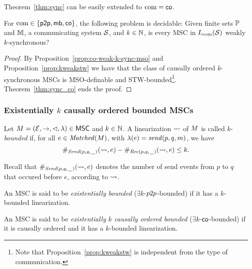 \documentclass{article}
\begin{document}
Theorem~\ref{thm:sync} can be easily extended to $\textup{com} = \mathsf{co}$.

\begin{theorem}\label{thm:co-weak-k-sync}
For $\textup{com} \in \{\mathsf{p2p}, \mathsf{mb},\mathsf{co}\}$, the following problem is decidable:
Given finite sets $\mathbb{P}$ and $\mathbb{M}$, a communicating system $\mathcal{S}$, and $k \in \mathbb{N}$,
is every MSC in $L_{\textup{com}}(\mathcal{S})$ weakly $k$-synchronous?
\end{theorem}
\begin{proof}
By Proposition~\ref{prop:co-weak-k-sync-mso} and Proposition~\ref{prop:kweakstw} we have that the class of causally ordered \emph{k}-synchronous MSCs is MSO-definable and STW-bounded\footnote{Note that Proposition~\ref{prop:kweakstw} is independent from the type of communication.}. Theorem~\ref{thm:sync_co} ends the proof.
\end{proof}

\subsubsection{Existentially \texorpdfstring{$k$}{k} causally ordered bounded MSCs} 

\begin{definition}
Let $M = (\mathcal{E},\to,\lhd,\lambda) \in \mathsf{MSC}$ and $k \in \mathbb{N}$.
A linearization $\rightsquigarrow$ of $M$ is called
$k$-\emph{bounded} if, for all $e \in \mathit{Matched}(M)$, with $\lambda(e) = \mathit{send}(p, q, m)$, we have 
\[
\#_{{\mathit{Send}(p,q,\hspace{0.1em}\underline{\hspace{0.5em}}\hspace{0.1em})}}(\rightsquigarrow,e) - \#_{{\mathit{Rec}(p,q,\hspace{0.1em}\underline{\hspace{0.5em}}\hspace{0.1em})}}(\rightsquigarrow,e) \le k.
\]
\end{definition}
\noindent Recall that $\#_{{\mathit{Send}(p,q,\hspace{0.1em}\underline{\hspace{0.5em}}\hspace{0.1em})}}(\rightsquigarrow,e)$ denotes the number of send events from $p$ to $q$ that occured before $e$, according to $\rightsquigarrow$.

\begin{definition}\label{def:ex_k_pp_bounded}
	An MSC is said to be \emph{existentially \pp bounded} ($\exists k$-$p2p$-bounded) if it has a $k$-bounded linearization.
\end{definition}

\begin{definition}\label{def:ex_k_co_bounded}
An MSC is said to be \emph{existentially $k$ causally ordered bounded} ($\exists k$-$\mathsf{co}$-bounded) if it is causally ordered and it has a $k$-bounded linearization.
\end{definition}
\end{document}
